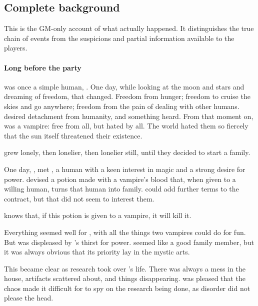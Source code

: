 \subsection{Complete background}

This is the GM-only account of what actually happened. It distinguishes the true chain of events from the suspicions and partial information available to the players.

\paragraph{Long before the party}

 was once a simple human, . One day, while looking at the moon and stars and dreaming of freedom, that changed. Freedom from hunger; freedom to cruise the skies and go anywhere; freedom from the pain of dealing with other humans.  desired detachment from humanity, and something heard. From that moment on,  was a vampire: free from all, but hated by all. The world hated them so fiercely that the sun itself threatened their existence.

 grew lonely, then lonelier, then lonelier still, until they decided to start a family.

One day, ,  met , a human with a keen interest in magic and a strong desire for power.  devised a potion made with a vampire's blood that, when given to a willing human, turns that human into family.  could add further terms to the contract, but that did not seem to interest them.

 knows that, if this potion is given to a vampire, it will kill it.

Everything seemed well for , with all the things two vampires could do for fun. But  was displeased by 's thirst for power.  seemed like a good family member, but it was always obvious that its priority lay in the mystic arts.

This became clear as research took over 's life. There was always a mess in the house, artifacts scattered about, and things disappearing.  was pleased that the chaos made it difficult for  to spy on the research being done, as disorder did not please the head.

